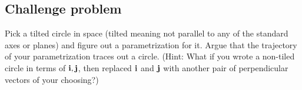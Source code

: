 \documentclass[11pt,oneside]{amsart}
\theoremstyle{definition}
\begin{document}
\subsection*{Challenge problem}
Pick a tilted circle in space (tilted meaning not parallel to any of the standard axes or planes) and figure out a parametrization for it. Argue that the trajectory of your parametrization traces out a circle. (Hint: What if you wrote a non-tiled circle in terms of $\mathbf i,\mathbf j$, then replaced $\mathbf i$ and $\mathbf j$ with another pair of perpendicular vectors of your choosing?)
\end{document}
